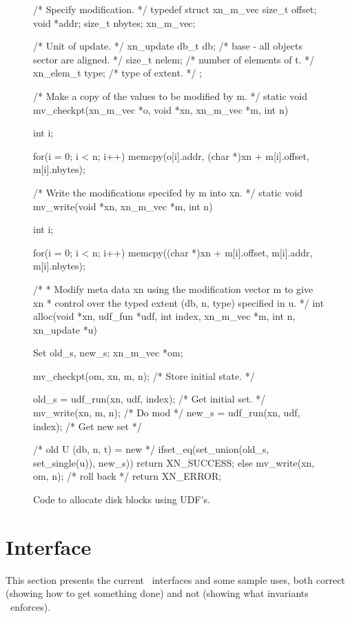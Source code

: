 \begin{figure*}

/* Specify modification. */
typedef struct xn_m_vec {
        size_t  offset;
        void    *addr;
        size_t  nbytes;
} xn_m_vec;

/* Unit of update. */
xn_update {
        db_t db;                /* base - all objects sector are aligned. */
        size_t nelem;           /* number of elements of t. */
        xn_elem_t type;         /* type of extent. */
};

/* Make a copy of the values to be modified by m. */
static void mv_checkpt(xn_m_vec *o, void *xn, xn_m_vec *m, int n) {
     int i;

     for(i = 0; i < n; i++)
           memcpy(o[i].addr, (char *)xn + m[i].offset, m[i].nbytes);
}

/* Write the modifications specifed by m into xn. */
static void mv_write(void *xn, xn_m_vec *m, int n) {
     int i;

     for(i = 0; i < n; i++)
          memcpy((char *)xn + m[i].offset, m[i].addr, m[i].nbytes);
}

/* 
 * Modify meta data xn using the modification vector m to give xn
 * control over the typed extent (db, n, type) specified in u.
 */
int alloc(void *xn, udf_fun *udf, int index, xn_m_vec *m, int n, xn_update *u) {
     Set old_s, new_s;
     xn_m_vec *om;

     mv_checkpt(om, xn, m, n);              /* Store initial state. */

     old_s = udf_run(xn, udf, index);       /* Get initial set. */
     mv_write(xn, m, n);                    /* Do mod */
     new_s = udf_run(xn, udf, index);       /* Get new set */

     /* old U (db, n, t) = new */
     ifset_eq(set_union(old_s, set_single(u)), new_s)) {
          return XN_SUCCESS;
     } else {
          mv_write(xn, om, n); 		/* roll back */
          return XN_ERROR;
     }
}
\caption{Code to allocate disk blocks using UDF's.}
\label{Figure:UDF}
\end{figure*}

\section{Interface}

This section presents the current \xxx\ interfaces and some sample
uses, both correct (showing how to get something done) and not (showing
what invariants \xxx\ enforces).

